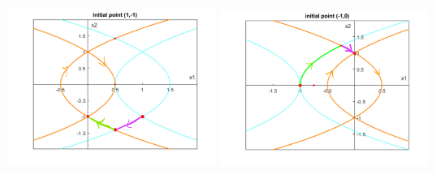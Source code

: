 \documentclass[12pt]{article}
\begin{document}
\begin{problem}[3]
\begin{enumerate}[label=(\alph*)]
\begin{figure}[H]
	\includegraphics[width=0.49\textwidth]{./figures/6.13.png}
	\includegraphics[width=0.49\textwidth]{./figures/6.14.png}
\end{figure}
\end{enumerate}
\end{problem}
\end{document}
